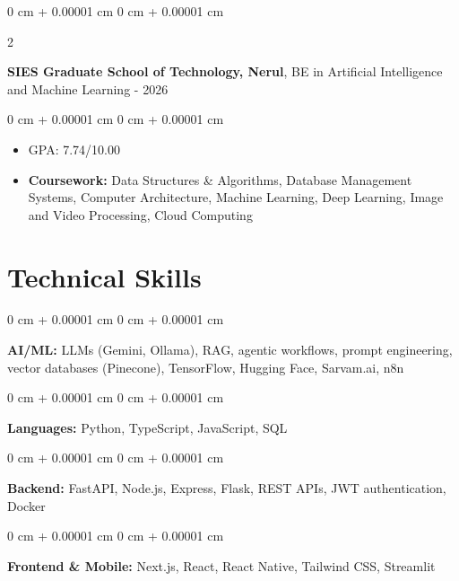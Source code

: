\documentclass[10pt, letterpaper]{article}
\newenvironment{highlights}{
    \begin{itemize}[
        topsep=0.10 cm,
        parsep=0.10 cm,
        partopsep=0pt,
        itemsep=0pt,
        leftmargin=0 cm + 10pt
    ]
}{
    \end{itemize}
} %
\newenvironment{onecolentry}{
    \begin{adjustwidth}{
        0 cm + 0.00001 cm
    }{
        0 cm + 0.00001 cm
    }
}{
    \end{adjustwidth}
} %
\newenvironment{twocolentry}[2][]{
    \onecolentry
    \def\secondColumn{#2}
    \setcolumnwidth{\fill, 4.5 cm}
    \begin{paracol}{2}
}{
    \switchcolumn \raggedleft \secondColumn
    \end{paracol}
    \endonecolentry
} %
\begin{document}
        
        \begin{twocolentry}{
            2022 - 2026
        }
            \textbf{SIES Graduate School of Technology, Nerul}, BE in Artificial Intelligence and Machine Learning\end{twocolentry}

        \vspace{0.10 cm}
        \begin{onecolentry}
            \begin{highlights}
                \item GPA: 7.74/10.00 
                \item \textbf{Coursework:} Data Structures \& Algorithms, Database Management Systems, Computer Architecture, Machine Learning, Deep Learning, Image and Video Processing, Cloud Computing
            \end{highlights}
        \end{onecolentry}


     \section{Technical Skills}

        \begin{onecolentry}
            \textbf{AI/ML:} LLMs (Gemini, Ollama), RAG, agentic workflows, prompt engineering, vector databases (Pinecone), TensorFlow, Hugging Face, Sarvam.ai, n8n
        \end{onecolentry}

        \vspace{0.2 cm}

        \begin{onecolentry}
            \textbf{Languages:} Python, TypeScript, JavaScript, SQL
        \end{onecolentry}

        \vspace{0.2 cm}

        \begin{onecolentry}
            \textbf{Backend:} FastAPI, Node.js, Express, Flask, REST APIs, JWT authentication, Docker
        \end{onecolentry}

        \vspace{0.2 cm}

        \begin{onecolentry}
            \textbf{Frontend \& Mobile:} Next.js, React, React Native, Tailwind CSS, Streamlit
        \end{onecolentry}
\end{document}
